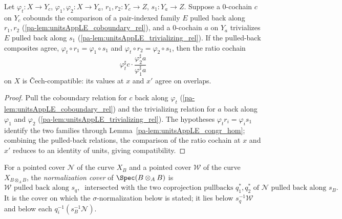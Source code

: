 \begin{lemma}
  \label{pa-lem:unitsAppLE_trivializing_ratio_compat}
  \leanok

  Let \(\varphi_t \colon X \to Y_c\), \(\varphi_1, \varphi_2 \colon X \to Y_a\), \(r_1, r_2
  \colon Y_c \to Z\), \(s_1 \colon Y_a \to Z\). Suppose a \(0\)-cochain \(c\) on \(Y_c\) cobounds
  the comparison of a pair-indexed family \(E\) pulled back along \(r_1, r_2\)
  (\ref{pa-lem:unitsAppLE_coboundary_rel}), and a \(0\)-cochain \(a\) on \(Y_a\) trivializes \(E\)
  pulled back along \(s_1\) (\ref{pa-lem:unitsAppLE_trivializing_rel}). If the pulled-back composites
  agree, \(\varphi_t \circ r_1 = \varphi_1 \circ s_1\) and \(\varphi_t \circ r_2 = \varphi_2
  \circ s_1\), then the ratio cochain
  \[
    \varphi_t^{\sharp} c \cdot \frac{\varphi_2^{\sharp} a}{\varphi_1^{\sharp} a}
  \]
  on \(X\) is \v Cech-compatible: its values at \(x\) and \(x'\) agree on overlaps.
\end{lemma}
\begin{proof}
  \leanok
  Pull the coboundary relation for \(c\) back along \(\varphi_t\)
  (\ref{pa-lem:unitsAppLE_coboundary_rel}) and the trivializing relation for \(a\) back along
  \(\varphi_1\) and \(\varphi_2\) (\ref{pa-lem:unitsAppLE_trivializing_rel}). The hypotheses
  \(\varphi_t r_i = \varphi_i s_1\) identify the two families through
  Lemma~\ref{pa-lem:unitsAppLE_congr_hom}; combining the pulled-back relations, the comparison of
  the ratio cochain at \(x\) and \(x'\) reduces to an identity of units, giving compatibility.
\end{proof}

\begin{definition}
  \label{pa-def:normalizationCover}
  \leanok

  For a pointed cover \(\mathcal N\) of the curve \(X_B\) and a pointed cover \(\mathcal W\) of
  the curve \(X_{B \otimes_A B}\), the \emph{normalization cover} of \(\Spec(B \otimes_A B)\) is
  \[
    \mathcal W \text{ pulled back along } s_q, \ \text{ intersected with the two coprojection
    pullbacks } q_1^{*}, q_2^{*} \text{ of } \mathcal N \text{ pulled back along } s_B .
  \]
  It is the cover on which the \(\sigma\)-normalization below is stated; it lies below \(s_q^{-1}
  \mathcal W\) and below each \(q_i^{-1}(s_B^{-1}\mathcal N)\).
\end{definition}

